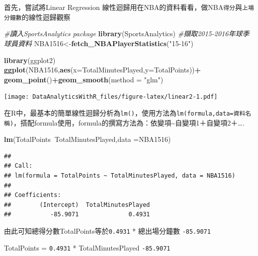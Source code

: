 \documentclass[]{book}
\newenvironment{Shaded}{\begin{snugshade}}{\end{snugshade}}
\newcommand{\CommentTok}[1]{\textcolor[rgb]{0.56,0.35,0.01}{\textit{#1}}}
\newcommand{\DataTypeTok}[1]{\textcolor[rgb]{0.13,0.29,0.53}{#1}}
\newcommand{\KeywordTok}[1]{\textcolor[rgb]{0.13,0.29,0.53}{\textbf{#1}}}
\newcommand{\NormalTok}[1]{#1}
\newcommand{\OperatorTok}[1]{\textcolor[rgb]{0.81,0.36,0.00}{\textbf{#1}}}
\newcommand{\StringTok}[1]{\textcolor[rgb]{0.31,0.60,0.02}{#1}}
\begin{document}
首先，嘗試將Linear Regression 線性迴歸用在NBA的資料看看，做NBA\texttt{得分}與\texttt{上場分鐘數}的線性迴歸觀察

\begin{Shaded}
\begin{Highlighting}[]
\CommentTok{#讀入SportsAnalytics package}
\KeywordTok{library}\NormalTok{(SportsAnalytics)}
\CommentTok{#擷取2015-2016年球季球員資料}
\NormalTok{NBA1516<-}\KeywordTok{fetch_NBAPlayerStatistics}\NormalTok{(}\StringTok{"15-16"}\NormalTok{)}
\end{Highlighting}
\end{Shaded}

\begin{Shaded}
\begin{Highlighting}[]
\KeywordTok{library}\NormalTok{(ggplot2)}
\KeywordTok{ggplot}\NormalTok{(NBA1516,}\KeywordTok{aes}\NormalTok{(}\DataTypeTok{x=}\NormalTok{TotalMinutesPlayed,}\DataTypeTok{y=}\NormalTok{TotalPoints))}\OperatorTok{+}
\StringTok{    }\KeywordTok{geom_point}\NormalTok{()}\OperatorTok{+}\KeywordTok{geom_smooth}\NormalTok{(}\DataTypeTok{method =} \StringTok{"glm"}\NormalTok{)}
\end{Highlighting}
\end{Shaded}

\texttt{[image: DataAnalyticsWithR\_files/figure-latex/linear2-1.pdf]}

在R中，最基本的簡單線性迴歸分析為\texttt{lm()}，使用方法為\texttt{lm(formula,data=資料名稱)}，搭配formula使用，formula的撰寫方法為：依變項\textasciitilde 自變項1＋自變項2＋\ldots.

\begin{Shaded}
\begin{Highlighting}[]
\KeywordTok{lm}\NormalTok{(TotalPoints}\OperatorTok{~}\NormalTok{TotalMinutesPlayed,}\DataTypeTok{data =}\NormalTok{NBA1516)}
\end{Highlighting}
\end{Shaded}

\begin{verbatim}
## 
## Call:
## lm(formula = TotalPoints ~ TotalMinutesPlayed, data = NBA1516)
## 
## Coefficients:
##        (Intercept)  TotalMinutesPlayed  
##           -85.9071              0.4931
\end{verbatim}

由此可知總得分數TotalPoints等於\texttt{0.4931} * 總出場分鐘數 \texttt{-85.9071}

TotalPoints = \texttt{0.4931} * TotalMinutesPlayed \texttt{-85.9071}
\end{document}
